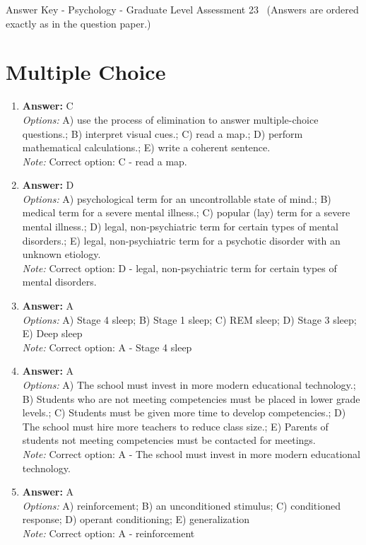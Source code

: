 \documentclass[12pt]{article}
\begin{document}
\begin{center}
Answer Key - Psychology - Graduate Level Assessment 23 \
\small (Answers are ordered exactly as in the question paper.)
\end{center}

\section*{Multiple Choice}
\begin{enumerate}[label=\arabic*.]
\item \textbf{Answer:} C
\\ \textit{Options:} A) use the process of elimination to answer multiple-choice questions.; B) interpret visual cues.; C) read a map.; D) perform mathematical calculations.; E) write a coherent sentence.
\\ \textit{Note:} Correct option: C - read a map.
\item \textbf{Answer:} D
\\ \textit{Options:} A) psychological term for an uncontrollable state of mind.; B) medical term for a severe mental illness.; C) popular (lay) term for a severe mental illness.; D) legal, non-psychiatric term for certain types of mental disorders.; E) legal, non-psychiatric term for a psychotic disorder with an unknown etiology.
\\ \textit{Note:} Correct option: D - legal, non-psychiatric term for certain types of mental disorders.
\item \textbf{Answer:} A
\\ \textit{Options:} A) Stage 4 sleep; B) Stage 1 sleep; C) REM sleep; D) Stage 3 sleep; E) Deep sleep
\\ \textit{Note:} Correct option: A - Stage 4 sleep
\item \textbf{Answer:} A
\\ \textit{Options:} A) The school must invest in more modern educational technology.; B) Students who are not meeting competencies must be placed in lower grade levels.; C) Students must be given more time to develop competencies.; D) The school must hire more teachers to reduce class size.; E) Parents of students not meeting competencies must be contacted for meetings.
\\ \textit{Note:} Correct option: A - The school must invest in more modern educational technology.
\item \textbf{Answer:} A
\\ \textit{Options:} A) reinforcement; B) an unconditioned stimulus; C) conditioned response; D) operant conditioning; E) generalization
\\ \textit{Note:} Correct option: A - reinforcement
\end{enumerate}
\end{document}
